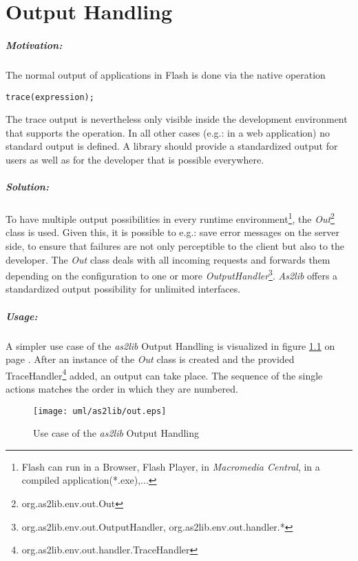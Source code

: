 \chapter{Output Handling}
\label{sec:OutputHandling}

\paragraph{Motivation:}
The normal output of applications in Flash is done via the native operation
\begin{lstlisting}[frame=single]
trace(expression);
\end{lstlisting}
The trace output is nevertheless only visible inside the development environment that supports the operation. In all other cases (e.g.: in a web application) no standard output is defined. A library should provide a standardized output for users as well as for the developer that is possible everywhere.

\paragraph{Solution:}
To have multiple output possibilities in every runtime environment\footnote{Flash can run in a Browser, Flash Player, in {\sl Macromedia Central}, in a compiled application(*.exe),...}, the \emph{Out}\footnote{org.as2lib.env.out.Out} class is used. Given this, it is possible to e.g.: save error messages on the server side, to ensure that failures are not only perceptible to the client but also to the developer. The \emph{Out} class deals with all incoming requests and forwards them depending on the configuration to one or more \emph{OutputHandler}\footnote{org.as2lib.env.out.OutputHandler, org.as2lib.env.out.handler.*}. {\sl As2lib} offers a standardized output possibility for unlimited interfaces.

\paragraph{Usage:}

A simpler use case of the {\sl as2lib} Output Handling is visualized in figure \ref{fig:outHandling} on page \pageref{fig:outHandling}. After an instance of the \emph{Out} class is created and the provided TraceHandler\footnote{org.as2lib.env.out.handler.TraceHandler} added, an output can take place. The sequence of the single actions matches the order in which they are numbered.

\begin{figure}[!ht]
\begin{center}
\texttt{[image: uml/as2lib/out.eps]}
\caption{Use case of the {\sl as2lib} Output Handling}
\label{fig:outHandling}
\end{center}
\end{figure}

